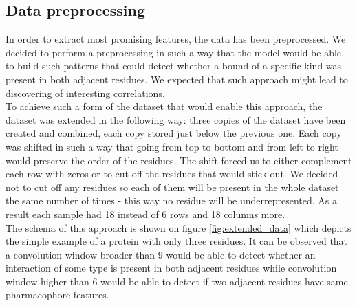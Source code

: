 \documentclass[a4paper,10pt]{report}
\begin{document}


	\subsection{Data preprocessing}\label{sec:data_processing}
	  In order to extract most promising features, the data has been preprocessed. We decided to perform a preprocessing in such a way that the model would be able to build such patterns that could detect whether a bound of a specific kind was present in both adjacent residues. We expected that such approach might lead to discovering of interesting correlations.\\
	  
	  To achieve such a form of the dataset that would enable this approach, the dataset was extended in the following way: three copies of the dataset have been created and combined, each copy stored just below the previous one. Each copy was shifted in such a way that going from top to bottom and from left to right would preserve the order of the residues. The shift forced us to either complement each row with zeros or to cut off the residues that would stick out. We decided not to cut off any residues so each of them will be present in the whole dataset the same number of times - this way no residue will be underrepresented. As a result each sample had 18 instead of 6 rows and 18 columns more.\\
	  
	  The schema of this approach is shown on figure \ref{fig:extended_data} which depicts the simple example of a protein with only three residues. It can be observed that a convolution window broader than 9 would be able to detect whether an interaction of some type is present in both adjacent residues while convolution window higher than 6 would be able to detect if two adjacent residues have same pharmacophore features.\\
	  
\end{document}
